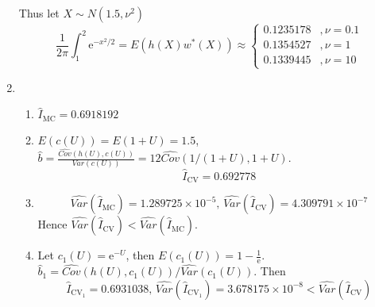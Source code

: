 \documentclass{article}
\begin{document}
\begin{enumerate}[leftmargin = 0 em, label = \arabic*., font = \bfseries]
	Thus let $X \sim N( 1.5, \nu^2)$
	\[\frac{1}{2 \pi}\int_{1}^2 \mathrm{e}^{-x^2/2} = E\left( h(X) w^* (X)\right) \approx \begin{cases}
		0.1235178 & , \nu = 0.1\\
		0.1354527 & , \nu = 1\\
		0.1339445 & , \nu = 10
	\end{cases}\]

	
	
	
	\item 
	\begin{enumerate}
		\item 
		$\hat{I}_{\mathrm{MC}} = 0.6918192$

		\item 
		$E(c(U)) = E(1 + U) = 1.5$, $\hat{b} = \frac{\widehat{Cov}(h(U), c(U))}{{Var}(c(U))} = 12 \widehat{Cov}(1/(1+U), 1 + U).$
		\[\hat{I}_{\mathrm{CV}} = 0.692778\]

		\item 
		\[\widehat{Var}(\hat{I}_{\mathrm{MC}}) = 1.289725 \times 10^{-5},\, \widehat{Var}({\hat{I}_{\mathrm{CV}}}) = 4.309791 \times 10^{-7} \]
		Hence $\widehat{Var}({\hat{I}_{\mathrm{CV}}}) < \widehat{Var}(\hat{I}_{\mathrm{MC}})$.

		\item 
		Let $c_1(U) = \mathrm{e}^{-U}$, then $E(c_1(U)) = 1 - \frac{1}{\mathrm{e}}$. $\hat{b}_{1} = \widehat{Cov}(h(U), c_1(U))/\widehat{Var}(c_1(U))$. Then
		\[\hat{I}_{\mathrm{CV}_1} = 0.6931038,\, \widehat{Var}(\hat{I}_{\mathrm{CV}_1}) = 3.678175 \times 10^{-8} < \widehat{Var}(\hat{I}_{\mathrm{CV}})\]

	\end{enumerate}	
	
	
 	\end{enumerate}

	
	
\end{document}
